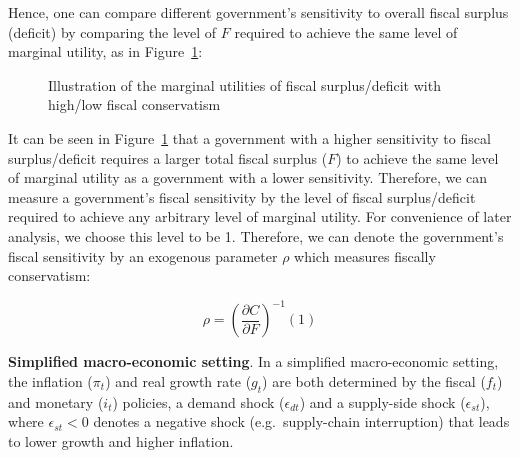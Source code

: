 \documentclass[
  a4paper,
  abstract=true]{scrartcl}
\theoremstyle{definition}
\begin{document}
Hence, one can compare different government's sensitivity to overall
fiscal surplus (deficit) by comparing the level of \(F\) required to
achieve the same level of marginal utility, as in
Figure~\ref{fig-marginal-C}:

\begin{figure}


\caption{\label{fig-marginal-C}Illustration of the marginal utilities of
fiscal surplus/deficit with high/low fiscal conservatism}

\end{figure}%

It can be seen in Figure~\ref{fig-marginal-C} that a government with a
higher sensitivity to fiscal surplus/deficit requires a larger total
fiscal surplus (\(F\)) to achieve the same level of marginal utility as
a government with a lower sensitivity. Therefore, we can measure a
government's fiscal sensitivity by the level of fiscal surplus/deficit
required to achieve any arbitrary level of marginal utility. For
convenience of later analysis, we choose this level to be 1. Therefore,
we can denote the government's fiscal sensitivity by an exogenous
parameter \(\rho\) which measures fiscally conservatism:

\[
\rho=\left( \frac{\partial C}{\partial F} \right)^{-1}(1)
\]

\textbf{Simplified macro-economic setting}. In a simplified
macro-economic setting, the inflation (\(\pi_t\)) and real growth rate
(\(g_t\)) are both determined by the fiscal (\(f_t\)) and monetary
(\(i_t\)) policies, a demand shock (\(\epsilon_{dt}\)) and a supply-side
shock (\(\epsilon_{st}\)), where \(\epsilon_{st}<0\) denotes a negative
shock (e.g.~supply-chain interruption) that leads to lower growth and
higher inflation.
\end{document}
